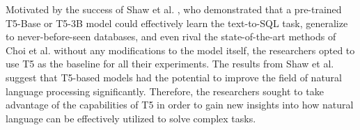 Motivated by the success of Shaw et al. \cite{shaw-etal-2021-compositional}, who demonstrated that a pre-trained T5-Base or T5-3B model could effectively learn the text-to-SQL task, generalize to never-before-seen databases, and even rival the state-of-the-art methods of Choi et al.\cite{10.1162/coli_a_00403} without any modifications to the model itself, the researchers opted to use T5 as the baseline for all their experiments. The results from Shaw et al.\cite{shaw-etal-2021-compositional} suggest that T5-based models had the potential to improve the field of natural language processing significantly. Therefore, the researchers sought to take advantage of the capabilities of T5 in order to gain new insights into how natural language can be effectively utilized to solve complex tasks.
